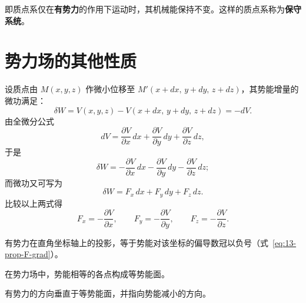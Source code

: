 即质点系仅在\textbf{有势力}的作用下运动时，其机械能保持不变。这样的质点系称为\textbf{保守系统}。

\section{势力场的其他性质}


设质点由 $M(x,y,z)$ 作微小位移至 $M'(x+dx,\,y+dy,\,z+dz)$，其势能增量的微功满足：
\begin{equation}\label{eq:13-prop-deltaW}
  \delta W=V(x,y,z)-V(x+dx,\,y+dy,\,z+dz)=-dV .
\end{equation}
由全微分公式
\begin{equation}\label{eq:13-prop-totaldiff}
  dV=\frac{\partial V}{\partial x}\,dx+\frac{\partial V}{\partial y}\,dy+\frac{\partial V}{\partial z}\,dz,
\end{equation}
于是
\begin{equation}\label{eq:13-prop-deltaW-expand}
  \delta W=-\frac{\partial V}{\partial x}\,dx-\frac{\partial V}{\partial y}\,dy-\frac{\partial V}{\partial z}\,dz ;
\end{equation}
而微功又可写为
\begin{equation}\label{eq:13-prop-W-comp}
  \delta W=F_x\,dx+F_y\,dy+F_z\,dz .
\end{equation}
比较以上两式得
\begin{equation}\label{eq:13-prop-F-grad}
  F_x=-\frac{\partial V}{\partial x},\qquad
  F_y=-\frac{\partial V}{\partial y},\qquad
  F_z=-\frac{\partial V}{\partial z}.
\end{equation}

\begin{property}[有势力的投影]
有势力在直角坐标轴上的投影，等于势能对该坐标的偏导数冠以负号（式~\eqref{eq:13-prop-F-grad}）。
\end{property}

\begin{property}[等势能面]
在势力场中，势能相等的各点构成等势能面。
\end{property}

\begin{property}[有势力的方向]
有势力的方向垂直于等势能面，并指向势能减小的方向。
\end{property}
